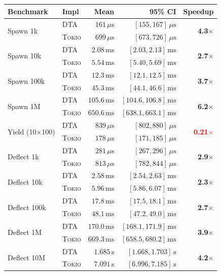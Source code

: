 \documentclass[11pt,a4paper]{article}
\newcommand{\dtact}{\textsc{DTA}}
\newcommand{\tokio}{\textsc{Tokio}}
\begin{document}
\begin{center}
\renewcommand{\arraystretch}{1.3}
\begin{tabular}{llrrr}
\toprule
Benchmark & Impl & Mean & 95\% CI & Speedup \\
\midrule
\multirow{2}{*}{Spawn 1k} & \dtact & $161\,\mu\mathrm{s}$ & $[155, 167]\,\mu\mathrm{s}$ & \multirow{2}{*}{\textbf{4.3$\times$}} \\
 & \tokio & $699\,\mu\mathrm{s}$ & $[673, 726]\,\mu\mathrm{s}$ & \\
\midrule
\multirow{2}{*}{Spawn 10k} & \dtact & $2.08\,\mathrm{ms}$ & $[2.03, 2.13]\,\mathrm{ms}$ & \multirow{2}{*}{\textbf{2.7$\times$}} \\
 & \tokio & $5.54\,\mathrm{ms}$ & $[5.40, 5.69]\,\mathrm{ms}$ & \\
\midrule
\multirow{2}{*}{Spawn 100k} & \dtact & $12.3\,\mathrm{ms}$ & $[12.1, 12.5]\,\mathrm{ms}$ & \multirow{2}{*}{\textbf{3.7$\times$}} \\
 & \tokio & $45.3\,\mathrm{ms}$ & $[44.1, 46.6]\,\mathrm{ms}$ & \\
\midrule
\multirow{2}{*}{Spawn 1M} & \dtact & $105.6\,\mathrm{ms}$ & $[104.6, 106.8]\,\mathrm{ms}$ & \multirow{2}{*}{\textbf{6.2$\times$}} \\
 & \tokio & $650.6\,\mathrm{ms}$ & $[638.1, 663.1]\,\mathrm{ms}$ & \\
\midrule
\multirow{2}{*}{Yield (10$\times$100)} & \dtact & $839\,\mu\mathrm{s}$ & $[802, 880]\,\mu\mathrm{s}$ & \multirow{2}{*}{\textcolor{red}{\textbf{0.21$\times$}}} \\
 & \tokio & $178\,\mu\mathrm{s}$ & $[171, 185]\,\mu\mathrm{s}$ & \\
\midrule
\multirow{2}{*}{Deflect 1k} & \dtact & $281\,\mu\mathrm{s}$ & $[267, 296]\,\mu\mathrm{s}$ & \multirow{2}{*}{\textbf{2.9$\times$}} \\
 & \tokio & $813\,\mu\mathrm{s}$ & $[782, 844]\,\mu\mathrm{s}$ & \\
\midrule
\multirow{2}{*}{Deflect 10k} & \dtact & $2.58\,\mathrm{ms}$ & $[2.54, 2.63]\,\mathrm{ms}$ & \multirow{2}{*}{\textbf{2.3$\times$}} \\
 & \tokio & $5.96\,\mathrm{ms}$ & $[5.86, 6.07]\,\mathrm{ms}$ & \\
\midrule
\multirow{2}{*}{Deflect 100k} & \dtact & $17.8\,\mathrm{ms}$ & $[17.5, 18.1]\,\mathrm{ms}$ & \multirow{2}{*}{\textbf{2.7$\times$}} \\
 & \tokio & $48.1\,\mathrm{ms}$ & $[47.2, 49.0]\,\mathrm{ms}$ & \\
\midrule
\multirow{2}{*}{Deflect 1M} & \dtact & $170.0\,\mathrm{ms}$ & $[168.1, 171.9]\,\mathrm{ms}$ & \multirow{2}{*}{\textbf{3.9$\times$}} \\
 & \tokio & $669.3\,\mathrm{ms}$ & $[658.5, 680.2]\,\mathrm{ms}$ & \\
\midrule
\multirow{2}{*}{Deflect 10M} & \dtact & $1.685\,\mathrm{s}$ & $[1.668, 1.703]\,\mathrm{s}$ & \multirow{2}{*}{\textbf{4.2$\times$}} \\
 & \tokio & $7.091\,\mathrm{s}$ & $[6.996, 7.185]\,\mathrm{s}$ & \\
\bottomrule
\end{tabular}
\end{center}
\end{document}
